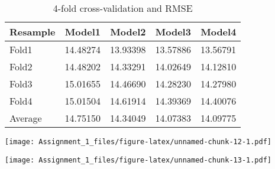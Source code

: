 \documentclass[
]{article}
\begin{document}
\begin{longtable}[t]{lrrrr}
\caption{\label{tab:unnamed-chunk-11} 4-fold cross-validation and RMSE}\\
\toprule
Resample & Model1 & Model2 & Model3 & Model4\\
\midrule
Fold1 & 14.48274 & 13.93398 & 13.57886 & 13.56791\\
Fold2 & 14.48202 & 14.33291 & 14.02649 & 14.12810\\
Fold3 & 15.01655 & 14.46690 & 14.28230 & 14.27980\\
Fold4 & 15.01504 & 14.61914 & 14.39369 & 14.40076\\
Average & 14.75150 & 14.34049 & 14.07383 & 14.09775\\
\bottomrule
\end{longtable}
\endgroup{}

\texttt{[image: Assignment\_1\_files/figure-latex/unnamed-chunk-12-1.pdf]}

\texttt{[image: Assignment\_1\_files/figure-latex/unnamed-chunk-13-1.pdf]}
\end{document}

